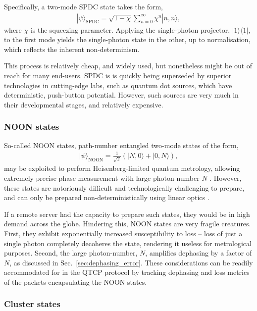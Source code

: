 \documentclass[aps,rmp,twocolumn,amsmath,amssymb,nofootinbib,superscriptaddress,longbibliography,floatfix]{revtex4-1}
\newcommand{\bra}[1]{\langle#1|}
\newcommand{\ket}[1]{|#1\rangle}
\begin{document}
Specifically, a two-mode SPDC state takes the form,
\begin{align}
\ket\psi_\mathrm{SPDC} = \sqrt{1-\chi} \sum_{n=0}^\infty \chi^n \ket{n,n},
\end{align}
where $\chi$ is the squeezing parameter. Applying the single-photon projector, \mbox{$\ket{1}\bra{1}$}, to the first mode yields the single-photon state in the other, up to normalisation, which reflects the inherent non-determinism.

This process is relatively cheap, and widely used, but nonetheless might be out of reach for many end-users. SPDC is is quickly being superseded by superior technologies in cutting-edge labs, such as quantum dot sources, which have deterministic, push-button potential. However, such sources are very much in their developmental stages, and relatively expensive.

%
%

\subsubsection{NOON states} \label{sec:NOON}

So-called NOON states, path-number entangled two-mode states of the form,
\begin{align}
\ket\psi_\mathrm{NOON} = \frac{1}{\sqrt{2}}(\ket{N,0}+\ket{0,N}),
\end{align}
may be exploited to perform Heisenberg-limited quantum metrology, allowing extremely precise phase measurement with large photon-number $N$ \cite{bib:Dowling08}. However, these states are notoriously difficult and technologically challenging to prepare, and can only be prepared non-deterministically using linear optics \cite{bib:Cable07}.

If a remote server had the capacity to prepare such states, they would be in high demand across the globe. Hindering this, NOON states are very fragile creatures. First, they exhibit exponentially increased susceptibility to loss -- loss of just a single photon completely decoheres the state, rendering it useless for metrological purposes. Second, the large photon-number, $N$, amplifies dephasing by a factor of $N$, as discussed in Sec.~\ref{sec:dephasing_error}. These considerations can be readily accommodated for in the QTCP protocol by tracking dephasing and loss metrics of the packets encapsulating the NOON states.

%
%

\subsubsection{Cluster states}
\end{document}
